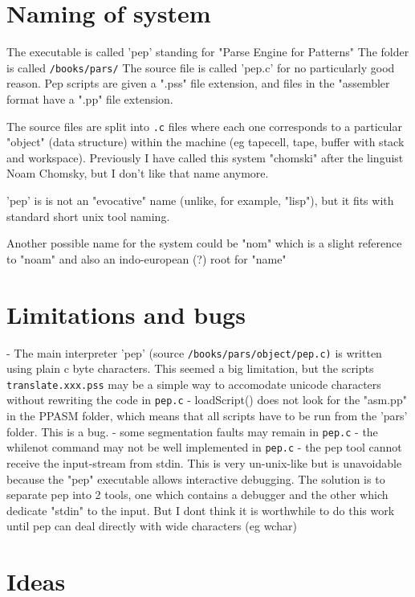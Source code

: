 \documentclass[a4paper,12pt]{article}
\begin{document}
  
\section{Naming of system}

  The executable is called 'pep' standing for "Parse Engine for Patterns"
  The folder is called \texttt{/books/pars/}
  The source file is called 'pep.c' for no particularly good reason.
  Pep scripts are given a ".pss" file extension, and files in the
  "assembler format have a ".pp" file extension.

  The source files are split into \texttt{.c} files where each one corresponds to a
  particular "object" (data structure) within the machine (eg tapecell, tape,
  buffer with stack and workspace). Previously I have called this system
  "chomski" after the linguist Noam Chomsky, but I don't like that name
  anymore.

  'pep' is is not an "evocative" name (unlike, for example, "lisp"),
  but it fits with standard short unix tool naming.

  Another possible name for the system could be "nom" which is a
  slight reference to "noam" and also an indo-european (?) root
  for "name"

\section{Limitations and bugs}

  - The main interpreter 'pep' (source \texttt{/books/pars/object/pep.c)} is
    written using plain c byte characters. This seemed a big limitation, but
    the scripts \texttt{translate.xxx.pss} may be a simple way to accomodate unicode
    characters without rewriting the code in \texttt{pep.c}
  - loadScript() does not look for the "asm.pp" in the PPASM folder,
    which means that all scripts have to be run from the 'pars' folder.
    This is a bug.
  - some segmentation faults may remain in \texttt{pep.c}
  - the whilenot command may not be well implemented in \texttt{pep.c}
  - the pep tool cannot receive the input-stream from stdin. This is
    very un-unix-like but is unavoidable because the "pep" executable
    allows interactive debugging. The solution is to
    separate pep into 2 tools, one which contains a debugger and the
    other which dedicate "stdin" to the input. But I dont think it is
    worthwhile to do this work until pep can deal directly with
    wide characters (eg wchar)

\section{Ideas}
\end{document}
